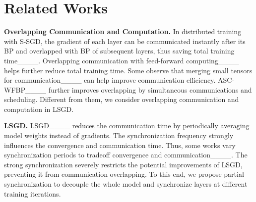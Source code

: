 \section{Related Works}
\label{sec:related}


\textbf{Overlapping Communication and Computation.}
In distributed training with S-SGD, the gradient of each layer can be communicated instantly after its BP and overlapped with BP of subsequent layers, thus saving total training time____. Overlapping communication with feed-forward computing____ helps further reduce total training time. Some observe that merging small tensors for communication____ can help improve communication efficiency. ASC-WFBP____ further improves overlapping by simultaneous communications and scheduling. Different from them, we consider overlapping communication and computation in LSGD.


\textbf{LSGD.}
LSGD____ reduces the communication time by periodically averaging model weights instead of gradients. The synchronization frequency strongly influences the convergence and communication time. Thus, some works vary synchronization periods to tradeoff convergence and communication____. The strong synchronization severely restricts the potential improvements of LSGD, preventing it from communication overlapping. To this end, we propose partial synchronization to decouple the whole model and synchronize layers at different training iterations.

